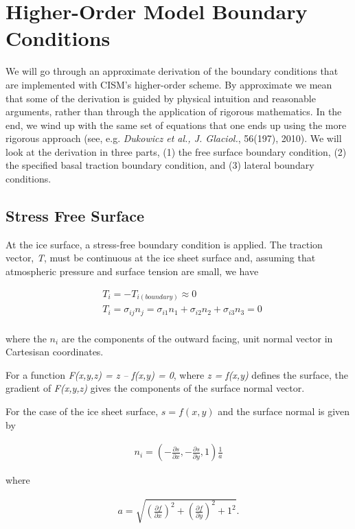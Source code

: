 
\section{Higher-Order Model Boundary Conditions}
\label{sc:higher-order-bcs}

We will go through an approximate derivation of the boundary conditions that are implemented with CISM's higher-order scheme. By approximate we mean that some of the derivation is guided by physical intuition and reasonable arguments, rather than through the application of rigorous mathematics. In the end, we wind up with the same set of equations that one ends up using the more rigorous approach (see, e.g. \textit{Dukowicz et al., J. Glaciol.}, 56(197), 2010). We will look at the derivation in three parts, (1) the free surface boundary condition, (2) the specified basal traction boundary condition, and (3) lateral boundary conditions.

\subsection{Stress Free Surface}
At the ice surface, a stress-free boundary condition is applied. The traction vector, \textit{{\large T}}, must be continuous at the ice sheet surface and, assuming that atmospheric pressure and surface tension are small, we have

\begin{align*}
 & T_{i}=-T_{i(boundary)}\approx 0 \\ 
 & T_{i}=\sigma _{ij}n_{j}=\sigma _{i1}n_{1}+\sigma _{i2}n_{2}+\sigma _{i3}n_{3}=0\\
\end{align*}

where the $n_i$ are the components of the outward facing, unit normal vector in Cartesisan coordinates.

For a function \textit{F(x,y,z) = z -- f(x,y) = 0}, where \textit{z = f(x,y)} defines the surface, the gradient of \textit{F(x,y,z)} gives the components of the surface normal vector.

For the case of the ice sheet surface, $s = f(x,y)$ and the surface normal is given by

\begin{align*}
n_{i}=\left( -\frac{\partial s}{\partial x},-\frac{\partial s}{\partial y},1 \right)\frac{1}{a}
\end{align*}

where

\begin{align*}
a=\sqrt{\left( \frac{\partial f}{\partial x} \right)^{2}+\left( \frac{\partial f}{\partial y} \right)^{2}+1^{2}}.
\end{align*}

